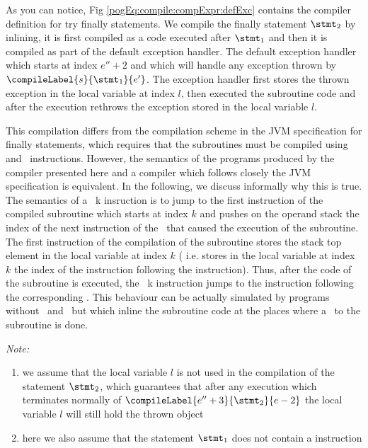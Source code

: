As you can notice, Fig \ref{pogEq:compile:compExpr:defExc} contains the compiler definition for try finally statements. 
We compile the finally statement $ \stmt_2 $ by inlining, it is first compiled as a code executed after $\stmt_1  $  and
then it is compiled as part of the default exception handler. The default exception handler which starts at index $e'' + 2 $ and 
which will  handle any exception thrown by $\compileLabel{s}{\stmt_1}{e'}$. The exception handler 
first stores the thrown exception in the local variable at index $l$, then executed the subroutine code and after the execution rethrows the exception 
stored in the local variable $l$. 

This compilation differs from the compilation scheme in the JVM specification for finally statements, which requires that the subroutines must be compiled using  and 
\ret \ instructions. However, the semantics of the programs produced by the compiler presented here and a compiler which follows closely the JVM specification 
is equivalent. 
In the following, we discuss informally why this is true.
 The semantics of a \jsr \ k insruction is to  jump to the first instruction of the compiled subroutine which starts at index $k$ and pushes on the
 operand stack the index of the next instruction of the \jsr \ that caused the execution of the subroutine. 
The first instruction of the compilation
of the subroutine stores the stack top element in the local variable at index $k$ ( i.e. stores in the local variable at index $k$ the index of the instruction following the  instruction). Thus, after the code of the subroutine is 
executed, the \ret \ k instruction jumps to 
 the instruction following the corresponding \jsr. This behaviour can be actually simulated by programs without \jsr \ and \ret \ but which inline the subroutine code
at the places where a \jsr \ to the subroutine is done.

\textit{Note:}
 \begin{enumerate}
           \item we assume that the local variable $l$ is not used in the compilation of the statement $\stmt_2$, which guarantees that after any execution which 
	   terminates normally of $\compileLabel{e'' + 3}{\stmt_2}{e - 2}$ the local variable  $l$ will still hold the thrown object
           \item here we also assume that the statement $\stmt_1$ does not contain a  instruction 
\end{enumerate}


